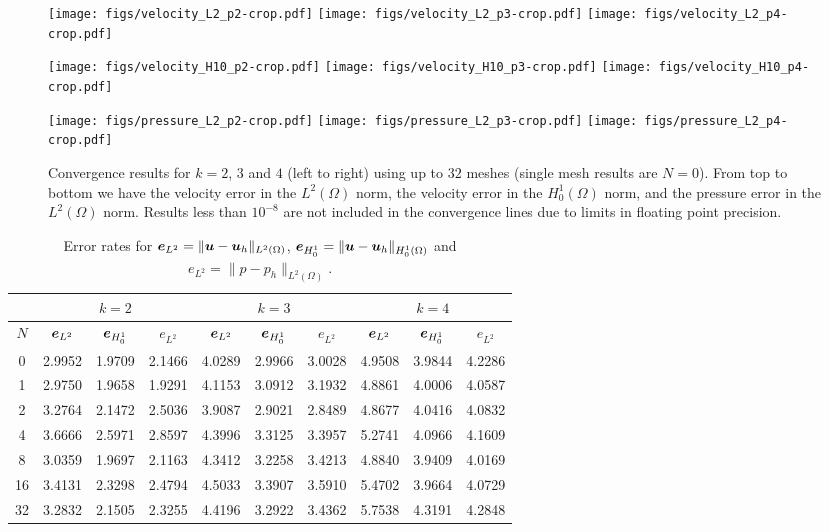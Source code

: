 \documentclass[graybox]{svmult}
\begin{document}
\begin{figure}
  \centering

  \texttt{[image: figs/velocity\_L2\_p2-crop.pdf]}
  \texttt{[image: figs/velocity\_L2\_p3-crop.pdf]}
  \texttt{[image: figs/velocity\_L2\_p4-crop.pdf]}

  \vspace{0.5cm}

  \texttt{[image: figs/velocity\_H10\_p2-crop.pdf]}
  \texttt{[image: figs/velocity\_H10\_p3-crop.pdf]}
  \texttt{[image: figs/velocity\_H10\_p4-crop.pdf]}

  \vspace{0.5cm}

  \texttt{[image: figs/pressure\_L2\_p2-crop.pdf]}
  \texttt{[image: figs/pressure\_L2\_p3-crop.pdf]}
  \texttt{[image: figs/pressure\_L2\_p4-crop.pdf]}
  \caption{Convergence results for $k=2$, $3$ and $4$ (left to right) using up to $32$ meshes (single mesh results are $N=0$). From top to bottom we have the velocity error in the $L^2(\Omega)$ norm, the velocity error in the $H^1_0(\Omega)$ norm, and the pressure error in the $L^2(\Omega)$ norm. Results less than $10^{-8}$ are not included in the convergence lines due to limits in floating point precision. }
  \label{fig:convplots}
\end{figure}

\begin{table}
  \centering
  \caption{Error rates for $\bm{e}_{L^2} = \|\bm{u} - \bm{u}_h\|_{L^2(\Omega)}$, $\bm{e}_{H^1_0} = \|\bm{u} - \bm{u}_h\|_{H^1_0(\Omega)}$ and $e_{L^2} = \|p - p_h\|_{L^2(\Omega)}$.}
  \label{table:rates}
  \begin{tabular}{|c | c c c | c c c | c c c|}
    \toprule
    & & $k=2$  & & & $k=3$  &  & & $k=4$  &   \\
    \midrule
    $N$&
    $\bm{e}_{L^2}$ & $\bm{e}_{H^1_0}$ & $e_{L^2}$ &
    $\bm{e}_{L^2}$ & $\bm{e}_{H^1_0}$ & $e_{L^2}$ &
    $\bm{e}_{L^2}$ & $\bm{e}_{H^1_0}$ & $e_{L^2}$ \\
    \midrule
    0 & 2.9952 & 1.9709 & 2.1466 & 4.0289 & 2.9966 & 3.0028 & 4.9508 & 3.9844 & 4.2286 \\
    1 & 2.9750 & 1.9658 & 1.9291 & 4.1153 & 3.0912 & 3.1932 & 4.8861 & 4.0006 & 4.0587 \\
    2 & 3.2764 & 2.1472 & 2.5036 & 3.9087 & 2.9021 & 2.8489 & 4.8677 & 4.0416 & 4.0832 \\
    4 & 3.6666 & 2.5971 & 2.8597 & 4.3996 & 3.3125 & 3.3957 & 5.2741 & 4.0966 & 4.1609 \\
    8 & 3.0359 & 1.9697 & 2.1163 & 4.3412 & 3.2258 & 3.4213 & 4.8840 & 3.9409 & 4.0169 \\
    16 & 3.4131 & 2.3298 & 2.4794 & 4.5033 & 3.3907 & 3.5910 & 5.4702 & 3.9664 & 4.0729 \\
    32 & 3.2832 & 2.1505 & 2.3255 & 4.4196 & 3.2922 & 3.4362 & 5.7538 & 4.3191 & 4.2848 \\
    \bottomrule
  \end{tabular}
\end{table}
\end{document}
